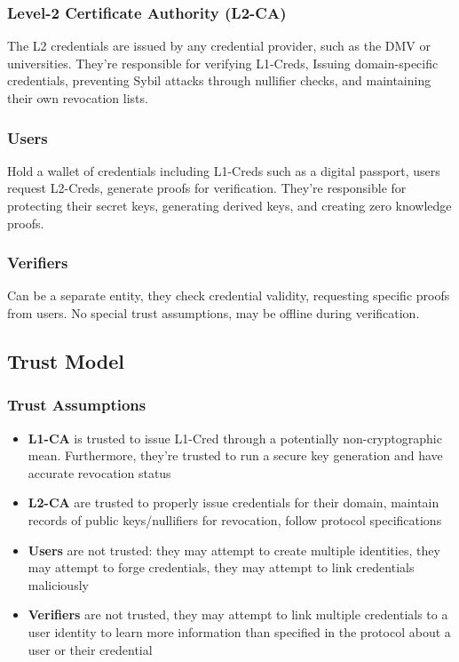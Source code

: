 \subsubsection{Level-2 Certificate Authority (L2-CA)}
The L2 credentials are issued by any credential provider, such as the DMV or universities. They're responsible for verifying L1-Creds, Issuing domain-specific credentials, preventing Sybil attacks through nullifier checks, and maintaining their own revocation lists.

\subsubsection{Users}
Hold a wallet of credentials including L1-Creds such as a digital passport, users request L2-Creds, generate proofs for verification. They're responsible for protecting their secret keys, generating derived keys, and creating zero knowledge proofs.

\subsubsection{Verifiers}
Can be a separate entity, they check credential validity, requesting specific proofs from users. No special trust assumptions, may be offline during verification.

\subsection{Trust Model}

\subsubsection{Trust Assumptions}
\begin{itemize}
    \item \textbf{L1-CA} is trusted to issue L1-Cred through a potentially non-cryptographic mean. Furthermore, they're trusted to run a secure key generation and have accurate revocation status

    \item \textbf{L2-CA} are trusted to properly issue credentials for their domain, maintain records of public keys/nullifiers for revocation, follow protocol specifications

    \item \textbf{Users} are not trusted: they may attempt to create multiple identities, they may attempt to forge credentials, they may attempt to link credentials maliciously

    \item \textbf{Verifiers} are not trusted, they may attempt to link multiple credentials to a user identity to learn more information than specified in the protocol about a user or their credential
\end{itemize}

